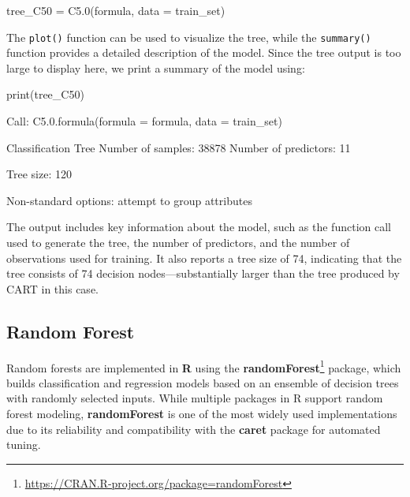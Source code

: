 \documentclass[
  11pt,
]{book}
\makeatletter
\newenvironment{Shaded}{}{}
\newcommand{\AttributeTok}[1]{#1}
\newcommand{\DecValTok}[1]{#1}
\newcommand{\FunctionTok}[1]{#1}
\newcommand{\NormalTok}[1]{#1}
\newcommand{\OtherTok}[1]{\textcolor[rgb]{0.39,0.39,0.39}{#1}}
\newcommand{\SpecialCharTok}[1]{\textcolor[rgb]{0.39,0.39,0.39}{#1}}
\renewcommand{\href}[2]{#2\footnote{\url{#1}}}
\newenvironment{kframe}{%
\medskip{}
\setlength{\fboxsep}{.8em}
 \def\at@end@of@kframe{}%
 \ifinner\ifhmode%
  \def\at@end@of@kframe{\end{minipage}}%
  \begin{minipage}{\columnwidth}%
 \fi\fi%
 \def\FrameCommand##1{\hskip\@totalleftmargin \hskip-\fboxsep
 \colorbox{shadecolor}{##1}\hskip-\fboxsep
     \hskip-\linewidth \hskip-\@totalleftmargin \hskip\columnwidth}%
 \MakeFramed {\advance\hsize-\width
   \@totalleftmargin\z@ \linewidth\hsize
   \@setminipage}}%
 {\par\unskip\endMakeFramed%
 \at@end@of@kframe}
\renewenvironment{Shaded}{\begin{kframe}}{\end{kframe}}
\theoremstyle{definition}
\theoremstyle{definition}
\theoremstyle{definition}
\theoremstyle{definition}
\theoremstyle{remark}
\makeatother
\begin{document}
\begin{Shaded}
\begin{Highlighting}[]
\NormalTok{tree\_C50 }\OtherTok{=} \FunctionTok{C5.0}\NormalTok{(formula, }\AttributeTok{data =}\NormalTok{ train\_set) }
\end{Highlighting}
\end{Shaded}

The \texttt{plot()} function can be used to visualize the tree, while the \texttt{summary()} function provides a detailed description of the model. Since the tree output is too large to display here, we print a summary of the model using:

\begin{Shaded}
\begin{Highlighting}[]
\FunctionTok{print}\NormalTok{(tree\_C50)}
   
\NormalTok{   Call}\SpecialCharTok{:}
   \FunctionTok{C5.0.formula}\NormalTok{(}\AttributeTok{formula =}\NormalTok{ formula, }\AttributeTok{data =}\NormalTok{ train\_set)}
   
\NormalTok{   Classification Tree}
\NormalTok{   Number of samples}\SpecialCharTok{:} \DecValTok{38878} 
\NormalTok{   Number of predictors}\SpecialCharTok{:} \DecValTok{11} 
   
\NormalTok{   Tree size}\SpecialCharTok{:} \DecValTok{120} 
   
\NormalTok{   Non}\SpecialCharTok{{-}}\NormalTok{standard options}\SpecialCharTok{:}\NormalTok{ attempt to group attributes}
\end{Highlighting}
\end{Shaded}

The output includes key information about the model, such as the function call used to generate the tree, the number of predictors, and the number of observations used for training. It also reports a tree size of 74, indicating that the tree consists of 74 decision nodes---substantially larger than the tree produced by CART in this case.

\subsection*{Random Forest}\label{random-forest}


Random forests are implemented in \textbf{R} using the \href{https://CRAN.R-project.org/package=randomForest}{\textbf{randomForest}} package, which builds classification and regression models based on an ensemble of decision trees with randomly selected inputs. While multiple packages in R support random forest modeling, \textbf{randomForest} is one of the most widely used implementations due to its reliability and compatibility with the \textbf{caret} package for automated tuning.
\end{document}

